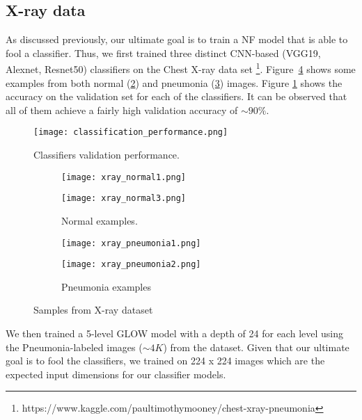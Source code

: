 \subsection{X-ray data}

As discussed previously, our ultimate goal is to train a NF model that is able to fool a classifier. Thus, we first trained three distinct CNN-based (VGG19, Alexnet, Resnet50) classifiers on the Chest X-ray data set \footnote{https://www.kaggle.com/paultimothymooney/chest-xray-pneumonia}. Figure~\ref{fig:x_rays} shows some examples from both normal (\ref{fig:normal}) and pneumonia (\ref{fig:pneumonia}) images. Figure \ref{fig:classifiers_performance} shows the accuracy on the validation set for each of the classifiers. It can be observed that all of them achieve a fairly high validation accuracy of $\sim 90\%$.
    \begin{figure}
        \centering
        \texttt{[image: classification\_performance.png]}
        \caption{Classifiers validation performance.}
        \label{fig:classifiers_performance}
    \end{figure}
\begin{figure}[htbp!]
     \centering
     \begin{subfigure}[b]{0.3\textwidth}
         \centering
         \texttt{[image: xray\_normal1.png]}
     \end{subfigure} 
     \hfill
     \begin{subfigure}[b]{0.3\textwidth}
         \centering
         \texttt{[image: xray\_normal3.png]}
         \caption{Normal examples.}
         \label{fig:normal}
     \end{subfigure}
     \hfill
     \begin{subfigure}[b]{0.3\textwidth}
         \centering
         \texttt{[image: xray\_pneumonia1.png]}
     \end{subfigure} 
     \hfill
     \begin{subfigure}[b]{0.3\textwidth}
         \centering
         \texttt{[image: xray\_pneumonia2.png]}
         \caption{Pneumonia examples}
         \label{fig:pneumonia}
     \end{subfigure}
     \hfill
     \caption{Samples from X-ray dataset}
     \label{fig:x_rays}
\end{figure}

We then trained a 5-level GLOW model with a depth of 24 for each level using the Pneumonia-labeled images ($\sim 4K$) from the dataset. Given that our ultimate goal is to fool the classifiers, we trained on 224 x 224 images which are the expected input dimensions for our classifier models. 

